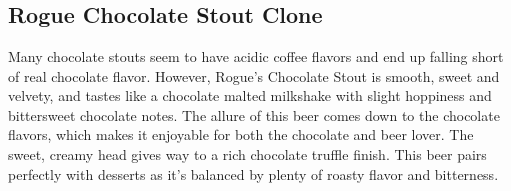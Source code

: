 \documentclass[10pt,oneside]{scrbook}
\begin{document}
\begin{ingredientsblock}

\begin{malts}
\end{malts}

\begin{hops}
\end{hops}

\begin{yeasts}
\end{yeasts}

\end{ingredientsblock}

\part{\styleamericanstout}

\chapter*{Rogue Chocolate Stout Clone}

\begin{aboutblock}
Many chocolate stouts seem to have acidic coffee flavors and end up falling short of real
chocolate flavor. However, Rogue’s Chocolate Stout is smooth, sweet and velvety, and tastes
like a chocolate malted milkshake with slight hoppiness and bittersweet chocolate notes.
The allure of this beer comes down to the chocolate flavors, which makes it enjoyable for
both the chocolate and beer lover. The sweet, creamy head gives way to a rich chocolate
truffle finish. This beer pairs perfectly with desserts as it's balanced by plenty of roasty
flavor and bitterness.
\end{aboutblock}
\end{document}
